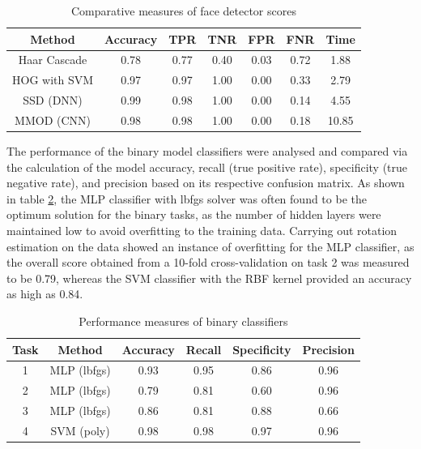 \documentclass[conference]{IEEEtran}
\begin{document}
\begin{table}[htp]
\caption{Comparative measures of face detector scores}
\begin{center}
\renewcommand{\arraystretch}{1.5}
\begin{tabular}{|c|c|c|c|c|c|c|}
\hline
Method & Accuracy & TPR & TNR & FPR & FNR & Time\\ \hline
Haar Cascade & 0.78 & 0.77 & 0.40 & 0.03 & 0.72 & 1.88 \\ \hline
HOG with SVM & 0.97 & 0.97 & 1.00 & 0.00 & 0.33 & 2.79 \\ \hline
SSD (DNN) & 0.99 & 0.98 & 1.00 & 0.00 & 0.14 & 4.55\\ \hline
MMOD (CNN) & 0.98 & 0.98 & 1.00 & 0.00 & 0.18 & 10.85\\ \hline
\end{tabular}
\end{center}
\label{tab: face}
\end{table}%

\break

The performance of the binary model classifiers were analysed and compared via the calculation of the model accuracy, recall (true positive rate), specificity (true negative rate), and precision based on its respective confusion matrix. 
As shown in table \ref{tab: bin}, the MLP classifier with lbfgs solver was often found to be the optimum solution for the binary tasks, as the number of hidden layers were maintained low to avoid overfitting to the training data. 
Carrying out rotation estimation on the data showed an instance of overfitting for the MLP classifier, as the overall score obtained from a 10-fold cross-validation on task 2 was measured to be 0.79, whereas the SVM classifier with the RBF kernel provided an accuracy as high as 0.84.

\begin{table}[htp]
\caption{Performance measures of binary classifiers}
\begin{center}
\renewcommand{\arraystretch}{1.5}
\begin{tabular}{|c|c|c|c|c|c|}
\hline
Task & Method & Accuracy & Recall & Specificity & Precision\\ \hline
1 & MLP (lbfgs) & 0.93 & 0.95 & 0.86 & 0.96\\ \hline
2 & MLP (lbfgs) & 0.79 & 0.81 & 0.60 & 0.96\\ \hline
3 & MLP (lbfgs) & 0.86 & 0.81 & 0.88 & 0.66\\ \hline
4& SVM (poly) & 0.98 & 0.98 & 0.97 & 0.96\\ \hline
\end{tabular}
\end{center}
\label{tab: bin}
\end{table}%
\end{document}
